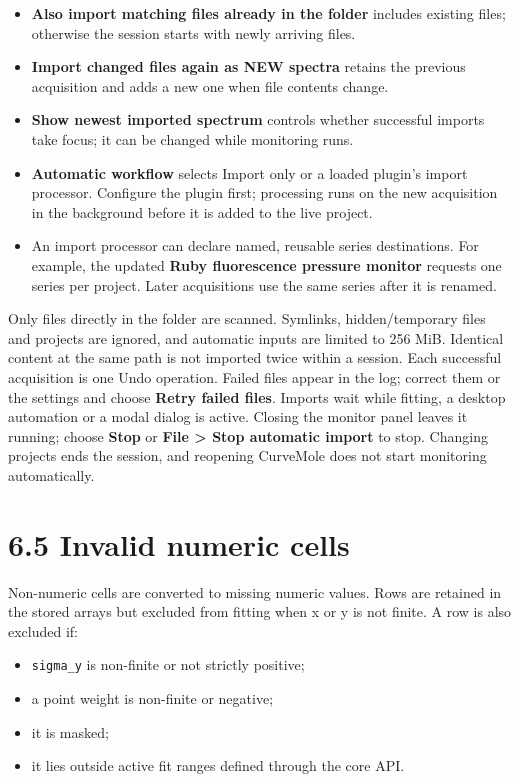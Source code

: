 \documentclass[
  10pt,
  a4paper,
  oneside]{scrreprt}
\providecommand{\tightlist}{%
  \setlength{\itemsep}{0pt}\setlength{\parskip}{0pt}}
\begin{document}
\begin{itemize}
\tightlist
\item
  \textbf{Also import matching files already in the folder} includes
  existing files; otherwise the session starts with newly arriving
  files.
\item
  \textbf{Import changed files again as NEW spectra} retains the
  previous acquisition and adds a new one when file contents change.
\item
  \textbf{Show newest imported spectrum} controls whether successful
  imports take focus; it can be changed while monitoring runs.
\item
  \textbf{Automatic workflow} selects Import only or a loaded plugin's
  import processor. Configure the plugin first; processing runs on the
  new acquisition in the background before it is added to the live
  project.
\item
  An import processor can declare named, reusable series destinations.
  For example, the updated \textbf{Ruby fluorescence pressure monitor}
  requests one series per project. Later acquisitions use the same
  series after it is renamed.
\end{itemize}

Only files directly in the folder are scanned. Symlinks,
hidden/temporary files and projects are ignored, and automatic inputs
are limited to 256 MiB. Identical content at the same path is not
imported twice within a session. Each successful acquisition is one Undo
operation. Failed files appear in the log; correct them or the settings
and choose \textbf{Retry failed files}. Imports wait while fitting, a
desktop automation or a modal dialog is active. Closing the monitor
panel leaves it running; choose \textbf{Stop} or \textbf{File
\textgreater{} Stop automatic import} to stop. Changing projects ends
the session, and reopening CurveMole does not start monitoring
automatically.

\hypertarget{invalid-numeric-cells}{%
\section{6.5 Invalid numeric cells}\label{invalid-numeric-cells}}

Non-numeric cells are converted to missing numeric values. Rows are
retained in the stored arrays but excluded from fitting when x or y is
not finite. A row is also excluded if:

\begin{itemize}
\tightlist
\item
  \texttt{sigma\_y} is non-finite or not strictly positive;
\item
  a point weight is non-finite or negative;
\item
  it is masked;
\item
  it lies outside active fit ranges defined through the core API.
\end{itemize}
\end{document}
